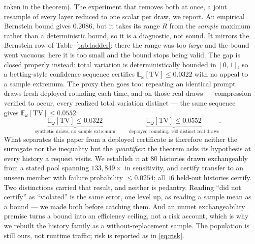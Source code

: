 \documentclass[11pt]{article}
\renewcommand{\_}{\WCorigunderscore\allowbreak}
\begin{document}
token in the theorem). The experiment that removes both at once, a joint
resample of every layer reduced to one scalar per draw, we report. An empirical Bernstein bound gives
$0.2086$, but it takes its range $R$ from the \emph{sample} maximum
rather than a deterministic bound, so it is a diagnostic, not sound. It mirrors the Bernstein row of
Table~\ref{tab:ladder}: there the range was too \emph{large} and the
bound went vacuous; here it is too small and the bound stops being
valid. The gap is closed properly instead:
total variation is deterministically bounded in $[0,1]$, so a
betting-style confidence sequence certifies
$\mathbb{E}_\omega[\mathrm{TV}]\le0.0322$ with no appeal to a sample
extremum. The proxy then goes too: repeating an identical prompt draws
fresh deployed rounding each time, and on those real draws --- compression
verified to occur, every realized total variation distinct --- the same
sequence gives $\mathbb{E}_\omega[\mathrm{TV}]\le0.0552$:
\begin{equation}
\underbrace{\mathbb{E}_\omega[\mathrm{TV}]\le0.0322}
      _{\text{synthetic draws, no sample extremum}}
\qquad
\underbrace{\mathbb{E}_\omega[\mathrm{TV}]\le0.0552}
      _{\text{deployed rounding, }160\text{ distinct real draws}} .
\label{eq:csboth}
\end{equation}
What separates this paper from a deployed
certificate is therefore neither the surrogate nor the inequality but
the \emph{quantifier}: the theorem asks its hypothesis at every history
a request visits. We establish it at $80$ histories drawn
exchangeably from a stated pool spanning $133{,}849\times$ in
sensitivity, and certify transfer to an unseen member with failure
probability $\le0.0254$; all $16$ held-out histories certify. \enlargethispage{6\baselineskip}%
Two distinctions carried that result, and neither is pedantry.
Reading ``did not certify'' as ``violated'' is the same error, one level
up, as reading a sample mean as a bound --- we made both before catching
them. And an unmet exchangeability premise turns a bound into an
efficiency ceiling, not a risk account, which is why we rebuilt the
history family as a without-replacement sample. The population is still
ours, not runtime traffic; risk is reported as in \eqref{eq:risk}.




\end{document}
